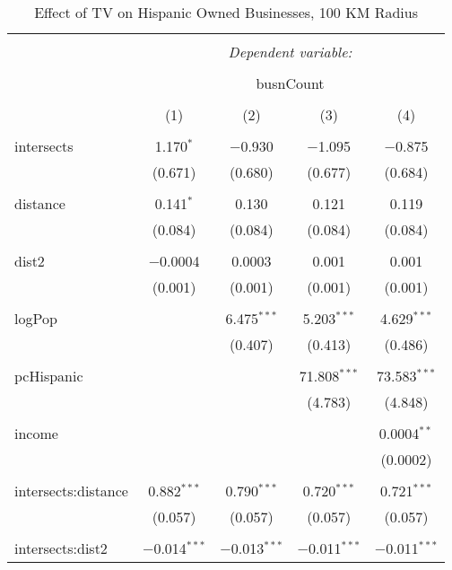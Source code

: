 
\begin{table}[!htbp] \centering 
  \caption{Effect of TV on Hispanic Owned Businesses, 100 KM Radius} 
  \label{} 
\begin{tabular}{@{\extracolsep{-5pt}}lcccc} 
\\[-1.8ex]\hline 
\hline \\[-1.8ex] 
 & \multicolumn{4}{c}{\textit{Dependent variable:}} \\ 
\cline{2-5} 
\\[-1.8ex] & \multicolumn{4}{c}{busnCount} \\ 
\\[-1.8ex] & (1) & (2) & (3) & (4)\\ 
\hline \\[-1.8ex] 
 intersects & 1.170$^{*}$ & $-$0.930 & $-$1.095 & $-$0.875 \\ 
  & (0.671) & (0.680) & (0.677) & (0.684) \\ 
  & & & & \\ 
 distance & 0.141$^{*}$ & 0.130 & 0.121 & 0.119 \\ 
  & (0.084) & (0.084) & (0.084) & (0.084) \\ 
  & & & & \\ 
 dist2 & $-$0.0004 & 0.0003 & 0.001 & 0.001 \\ 
  & (0.001) & (0.001) & (0.001) & (0.001) \\ 
  & & & & \\ 
 logPop &  & 6.475$^{***}$ & 5.203$^{***}$ & 4.629$^{***}$ \\ 
  &  & (0.407) & (0.413) & (0.486) \\ 
  & & & & \\ 
 pcHispanic &  &  & 71.808$^{***}$ & 73.583$^{***}$ \\ 
  &  &  & (4.783) & (4.848) \\ 
  & & & & \\ 
 income &  &  &  & 0.0004$^{**}$ \\ 
  &  &  &  & (0.0002) \\ 
  & & & & \\ 
 intersects:distance & 0.882$^{***}$ & 0.790$^{***}$ & 0.720$^{***}$ & 0.721$^{***}$ \\ 
  & (0.057) & (0.057) & (0.057) & (0.057) \\ 
  & & & & \\ 
 intersects:dist2 & $-$0.014$^{***}$ & $-$0.013$^{***}$ & $-$0.011$^{***}$ & $-$0.011$^{***}$ \\ 

\end{tabular}
\end{table}
